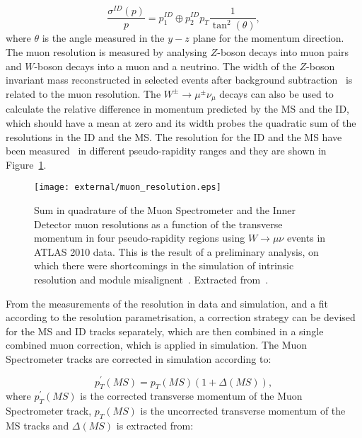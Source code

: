 \begin{equation}
\displaystyle
\frac{\sigma^{ID}(p)}{p} = p_1^{ID} \oplus p_2^{ID} p_T \frac{1}{\tan^2(\theta)},
\label{eq:muon_res_id_eta19}
\end{equation}
where $\theta$ is the angle measured in the $y-z$ plane for the momentum direction.
The muon resolution is measured by analysing $Z$-boson decays into muon pairs and $W$-boson decays into a muon and a neutrino. The width of the $Z$-boson invariant mass
reconstructed in selected events after background subtraction~\cite{muonres2010} is related to the muon resolution.
The $W^{\pm} \rightarrow \mu^{\pm} \nu_\mu$ decays
can also be used to calculate the
relative difference in momentum predicted by the MS and the ID, which should have a mean at zero and its width probes the quadratic sum of the resolutions in the ID
and the MS. The resolution for the ID and the MS have been measured~\cite{muonres2010}
in different pseudo-rapidity ranges and they are shown in Figure~\ref{fig:muon_resolution}.

\begin{figure}
\centering
\texttt{[image: external/muon\_resolution.eps]}
\caption{Sum in quadrature of the Muon Spectrometer and the Inner Detector muon resolutions as a function of the transverse momentum in four pseudo-rapidity regions using $W \rightarrow \mu \nu$ events in ATLAS 2010 data. This is the result of a preliminary analysis, on which there were shortcomings in the simulation of intrinsic resolution and module misalignent~\cite{muonres2010}. Extracted from~\cite{muonres2010}.}
\label{fig:muon_resolution}
\end{figure}

From the measurements of the resolution in data and simulation, and a fit according to the resolution parametrisation, a correction strategy can be devised
for the MS and ID tracks separately, which are then combined in a single combined muon correction, which is applied in simulation.
The Muon Spectrometer tracks are corrected in simulation according to:

\begin{equation}
\displaystyle
p_T^{\prime} (MS) = p_T(MS) (1 + \Delta (MS) ),
\label{eq:muon_ptms_cor}
\end{equation}
where $p_T^{\prime} (MS)$ is the corrected transverse momentum of the Muon Spectrometer track, $p_T(MS)$ is the uncorrected transverse momentum of the MS tracks and $\Delta(MS)$
is extracted from:

